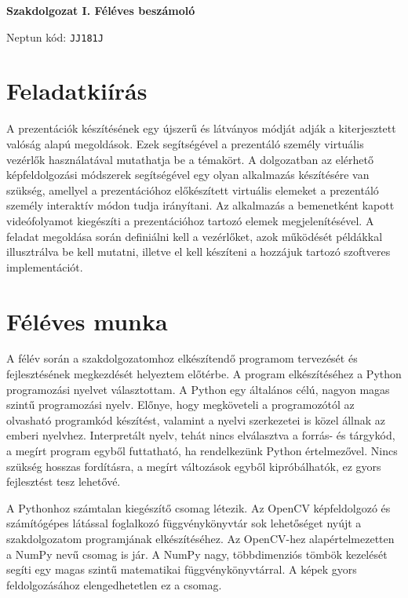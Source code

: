 \documentclass[a4paper]{article}
\begin{document}
\noindent \textbf{Szakdolgozat I. Féléves beszámoló}

\vskip 8mm


\vskip 4mm

\noindent Neptun kód: \texttt{JJ181J}

\vskip 1cm

\section*{Feladatkiírás}

A prezentációk készítésének egy újszerű és látványos módját adják a kiterjesztett valóság alapú megoldások. Ezek segítségével a prezentáló személy virtuális vezérlők használatával mutathatja be a témakört. A dolgozatban az elérhető képfeldolgozási módszerek segítségével egy olyan alkalmazás készítésére van szükség, amellyel a prezentációhoz előkészített virtuális elemeket a prezentáló személy interaktív módon tudja irányítani. Az alkalmazás a bemenetként kapott videófolyamot kiegészíti a prezentációhoz tartozó elemek megjelenítésével. A feladat megoldása során definiálni kell a vezérlőket, azok működését példákkal illusztrálva be kell mutatni, illetve el kell készíteni a hozzájuk tartozó szoftveres implementációt.

\section*{Féléves munka}

A félév során a szakdolgozatomhoz elkészítendő programom tervezését és fejlesztésének megkezdését helyeztem előtérbe. A program elkészítéséhez a Python programozási nyelvet választottam. A Python egy általános célú, nagyon magas szintű programozási nyelv. Előnye, hogy megköveteli a programozótól az olvasható programkód készítést, valamint a nyelvi szerkezetei is közel állnak az emberi nyelvhez. Interpretált nyelv, tehát nincs elválasztva a forrás- és tárgykód, a megírt program egyből futtatható, ha rendelkezünk Python értelmezővel. Nincs szükség hosszas fordításra, a megírt változások egyből kipróbálhatók, ez gyors fejlesztést tesz lehetővé.

A Pythonhoz számtalan kiegészítő csomag létezik. Az OpenCV képfeldolgozó és számítógépes látással foglalkozó függvénykönyvtár sok lehetőséget nyújt a szakdolgozatom programjának elkészítéséhez. Az OpenCV-hez alapértelmezetten a NumPy nevű csomag is jár. A NumPy nagy, többdimenziós tömbök kezelését segíti egy magas szintű matematikai függvénykönyvtárral. A képek gyors feldolgozásához elengedhetetlen ez a csomag.
\end{document}
